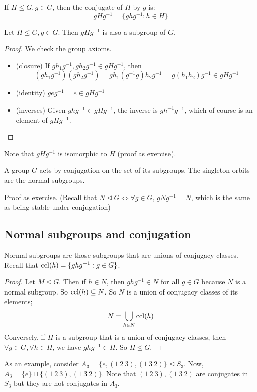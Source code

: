 \begin{definition}
	If \(H \leq G, g \in G\), then the conjugate of \(H\) by \(g\) is:
	\[
		gHg^{-1} = \{ ghg^{-1} : h \in H \}
	\]
\end{definition}
\begin{proposition}
	Let \(H \leq G, g \in G\).
	Then \(gHg^{-1}\) is also a subgroup of \(G\).
\end{proposition}
\begin{proof}
	We check the group axioms.
	\begin{itemize}
		\item (closure) If \(gh_1g^{-1}, gh_2g^{-1} \in gHg^{-1}\), then
		      \[
			      (gh_1g^{-1})(gh_2g^{-1}) = gh_1(g^{-1}g)h_2g^{-1} = g(h_1h_2)g^{-1} \in gHg^{-1}
		      \]
		\item (identity) \(geg^{-1} = e \in gHg^{-1}\)
		\item (inverses) Given \(ghg^{-1} \in gHg^{-1}\), the inverse is \(gh^{-1}g^{-1}\), which of course is an element of \(gHg^{-1}\).
	\end{itemize}
\end{proof}
Note that \(gHg^{-1}\) is isomorphic to \(H\) (proof as exercise).
\begin{proposition}
	A group \(G\) acts by conjugation on the set of its subgroups.
	The singleton orbits are the normal subgroups.
\end{proposition}
Proof as exercise.
(Recall that \(N \trianglelefteq G \iff \forall g \in G,\, gNg^{-1} = N\), which is the same as being stable under conjugation)

\subsection{Normal subgroups and conjugation}
\begin{proposition}
	Normal subgroups are those subgroups that are unions of conjugacy classes.
	Recall that \(\operatorname{ccl}(h) = \{ ghg^{-1} : g \in G \}\).
\end{proposition}
\begin{proof}
	Let \(M \trianglelefteq G\).
	Then if \(h \in N\), then \(ghg^{-1} \in N\) for all \(g \in G\) because \(N\) is a normal subgroup.
	So \(\operatorname{ccl}(h) \subseteq N\).
	So \(N\) is a union of conjugacy classes of its elements;
	\[
		N = \bigcup_{h \in N} \operatorname{ccl}(h)
	\]
	Conversely, if \(H\) is a subgroup that is a union of conjugacy classes, then \(\forall g \in G, \forall h \in H\), we have \(ghg^{-1} \in H\).
	So \(H \trianglelefteq G\).
\end{proof}
As an example, consider \(A_3 = \{ e, (1\ 2\ 3), (1\ 3\ 2) \} \trianglelefteq S_3\).
Now, \(A_3 = \{ e \} \sqcup \{ (1\ 2\ 3), (1\ 3\ 2) \}\).
Note that \((1\ 2\ 3), (1\ 3\ 2)\) are conjugates in \(S_3\) but they are not conjugates in \(A_3\).


